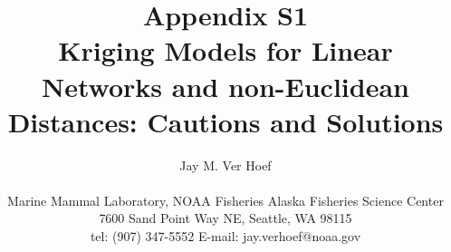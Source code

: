 \documentclass[11pt, titlepage]{article}\usepackage[]{graphicx}\usepackage[]{color}
\begin{document}

\titlepage
\title {\textbf{Appendix S1} \\ Kriging Models for Linear Networks and non-Euclidean Distances: Cautions and Solutions}
\author{Jay M. Ver Hoef \\
\hrulefill \\ 
Marine Mammal Laboratory, NOAA Fisheries Alaska Fisheries Science Center\\
7600 Sand Point Way NE, Seattle, WA 98115\\
tel: (907) 347-5552 \hspace{.5cm} E-mail: jay.verhoef@noaa.gov\\
\hrulefill \\
}

\maketitle
\end{document}
